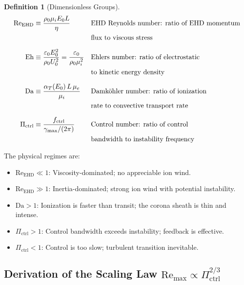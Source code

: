 \documentclass[12pt,twocolumn]{article}
\newtheorem{definition}{Definition}
\newcommand{\Reehd}{\mathrm{Re}_{\mathrm{EHD}}}
\newcommand{\Pctrl}{\Pi_{\mathrm{ctrl}}}
\begin{document}
\begin{definition}[Dimensionless Groups]
\label{def:nondim}
\begin{align}
  \Reehd &\equiv \frac{\rho_0 \mu_i E_0 L}{\eta}
  & & \text{\textnormal{EHD Reynolds number:} ratio of EHD momentum}
  \nonumber \\
  & & & \text{\textnormal{flux to viscous stress}}
  \label{eq:Re_EHD_def} \\[6pt]
  \mathrm{Eh} &\equiv \frac{\varepsilon_0 E_0^2}{\rho_0 U_0^2}
  = \frac{\varepsilon_0}{\rho_0 \mu_i^2}
  & & \text{\textnormal{Ehlers number:} ratio of electrostatic}
  \nonumber \\
  & & & \text{\textnormal{to kinetic energy density}}
  \label{eq:Eh_def} \\[6pt]
  \mathrm{Da} &\equiv \frac{\alpha_T(E_0)\,L\,\mu_e}{\mu_i}
  & & \text{\textnormal{Damk\"{o}hler number:} ratio of ionization}
  \nonumber \\
  & & & \text{\textnormal{rate to convective transport rate}}
  \label{eq:Da_def} \\[6pt]
  \Pctrl &\equiv \frac{f_{\mathrm{ctrl}}}{\gamma_{\max}/(2\pi)}
  & & \text{\textnormal{Control number:} ratio of control}
  \nonumber \\
  & & & \text{\textnormal{bandwidth to instability frequency}}
  \label{eq:Pi_ctrl_def}
\end{align}
\end{definition}

The physical regimes are:
\begin{itemize}
  \item $\Reehd \ll 1$: Viscosity-dominated; no appreciable ion
    wind.
  \item $\Reehd \gg 1$: Inertia-dominated; strong ion wind with
    potential instability.
  \item $\mathrm{Da} > 1$: Ionization is faster than transit; the
    corona sheath is thin and intense.
  \item $\Pctrl > 1$: Control bandwidth exceeds instability; feedback
    is effective.
  \item $\Pctrl < 1$: Control is too slow; turbulent transition
    inevitable.
\end{itemize}

\subsection{Derivation of the Scaling Law
  $\mathrm{Re}_{\max} \propto \Pctrl^{2/3}$}
\label{sec:scaling}
\end{document}
